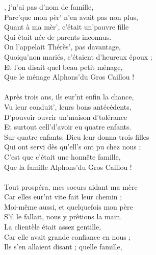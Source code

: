 
, j'n'ai pas d'nom de famille,
\\Parc'que mon pèr' n'en avait pas non plus,
\\Quant à ma mèr', c'était un'pauvre fille
\\Qui était née de parents inconnus.
\\On l'appelait Thérès', pas davantage,
\\Quoiqu'non mariés, c'étaient d'heureux époux ;
\\Et l'on disait quel beau petit ménage,
\\Que le ménage Alphons'du Gros Caillou !
\\\\Après trois ans, ils eur'nt enfin la chance,
\\Vu leur conduit', leurs bons antécédents,
\\D'pouvoir ouvrir un'maison d'tolérance
\\Et surtout cell'd'avoir eu quatre enfants.
\\Sur quatre enfants, Dieu leur donna trois filles
\\Qui ont servi dès qu'ell's ont pu chez nous ;
\\C'est que c'était une honnête famille,
\\Que la famille Alphons'du Gros Caillou !
\\\\Tout prospéra, mes soeurs aidant ma mère
\\Car elles eur'nt vite fait leur chemin ;
\\Moi-même aussi, et quelquefois mon père
\\S'il le fallait, nous y prêtions la main.
\\La clientèle était assez gentille,
\\Car elle avait grande confiance en nous ;
\\Ils s'en allaient disant ; quelle famille,
